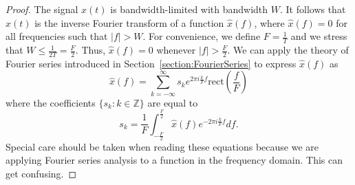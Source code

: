 \begin{proof}
The signal $x(t)$ is bandwidth-limited with bandwidth $W$.
It follows that $x(t)$ is the inverse Fourier transform of a function $\hat{x}(f)$, where $\hat{x}(f) = 0$ for all frequencies such that $|f| > W$.
For convenience, we define $F = \frac{1}{T}$ and we stress that $W \leq \frac{1}{2T} = \frac{F}{2}$.
Thus, $\hat{x}(f) = 0$ whenever $|f| > \frac{F}{2}$.
We can apply the theory of Fourier series introduced in Section~\ref{section:FourierSeries} to express $\hat{x}(f)$ as
\begin{equation*}
\hat{x}(f) = \sum_{k=-\infty}^{\infty} s_k e^{2 \pi i \frac{k}{F} f}
\mathrm{rect} \left( \frac{f}{F} \right)
\end{equation*}
where the coefficients $\{ s_k : k \in \mathbb{Z} \}$ are equal to
\begin{equation*}
s_k
= \frac{1}{F} \int_{-\frac{F}{2}}^{\frac{F}{2}}
\hat{x}(f) e^{- 2 \pi i \frac{k}{F} f} df .
\end{equation*}
Special care should be taken when reading these equations because we are applying Fourier series analysis to a function in the frequency domain.
This can get confusing.


\end{proof}
